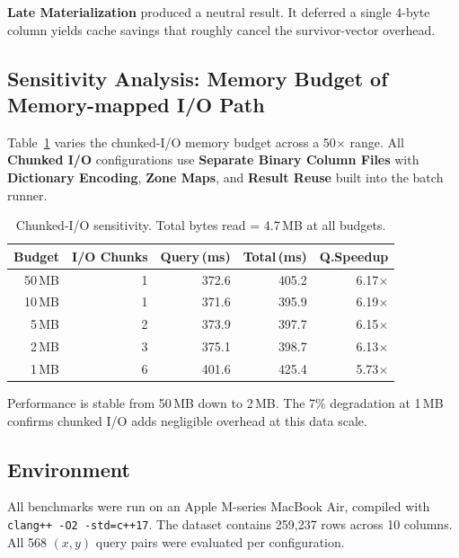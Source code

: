 \documentclass[11pt,a4paper]{article}
\begin{document}
\textbf{Late Materialization} produced a neutral result. It deferred a single 4-byte column yields cache savings that roughly cancel the survivor-vector overhead.

\subsection{Sensitivity Analysis: Memory Budget of Memory-mapped I/O Path}\label{sec:sensitivity}
Table~\ref{tab:d1} varies the chunked-I/O memory budget across a 50$\times$ range.
All \textbf{Chunked I/O} configurations use \textbf{Separate Binary Column Files} with \textbf{Dictionary Encoding}, \textbf{Zone Maps}, and \textbf{Result Reuse} built into the batch runner.

\begin{table}[H]\centering\footnotesize
\setlength{\tabcolsep}{3pt}
\begin{tabular}{@{}rrrrr@{}}
\toprule
Budget & I/O Chunks & Query\,(ms) & Total\,(ms) & Q.Speedup \\
\midrule
50\,MB & 1 & 372.6 & 405.2 & 6.17$\times$ \\
10\,MB & 1 & 371.6 & 395.9 & 6.19$\times$ \\
 5\,MB & 2 & 373.9 & 397.7 & 6.15$\times$ \\
 2\,MB & 3 & 375.1 & 398.7 & 6.13$\times$ \\
 1\,MB & 6 & 401.6 & 425.4 & 5.73$\times$ \\
\bottomrule
\end{tabular}
\caption{Chunked-I/O sensitivity. Total bytes read = 4.7\,MB at all budgets.}\label{tab:d1}
\end{table}

Performance is stable from 50\,MB down to 2\,MB. 
The 7\% degradation at 1\,MB confirms chunked I/O adds negligible overhead at this data scale.

\subsection{Environment}\label{sec:env}
All benchmarks were run on an Apple M-series MacBook Air, compiled with \texttt{clang++ -O2 -std=c++17}.
The dataset contains 259,237 rows across 10 columns.
All 568 $(x,y)$ query pairs were evaluated per configuration.

\end{document}
